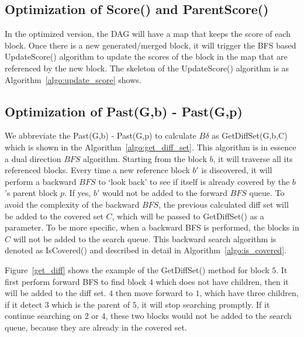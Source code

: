 \subsection{Optimization of Score() and ParentScore() }
In the optimized version, the DAG will have a map that keeps the score of each block. Once there is a new generated/merged block,
it will trigger the BFS based UpdateScore() algorithm to update the scores of the block in the map that are referenced by the new block.
The skeleton of the UpdateScore() algorithm is as Algorithm~\ref{algo:update_score} shows.



\subsection{Optimization of Past(G,b) - Past(G,p)}

We abbreviate the Past(G,b) - Past(G,p) to calculate $B\delta$ as GetDiffSet(G,b,C) which is shown in the Algorithm~\ref{algo:get_diff_set}.
This algorithm is in essence a dual direction $BFS$ algorithm. Starting from the block $b$, it will traverse all its referenced blocks.
Every time a new reference block $b'$ is discovered, it will perform a backward $BFS$ to `look back' to see if itself is already covered by the $b$'s parent block $p$. 
If yes, $b'$ would not be added to the forward $BFS$ queue.  
To avoid the complexity of the backward $BFS$, the previous calculated diff set will be added to the covered set $C$, which will be passed to GetDiffSet() as a parameter.
To be more specific, when a backward BFS is performed, the blocks in $C$ will not be added to the search queue.
This backward search algorithm is denoted as IsCovered() and described in detail in Algorithm~\ref{algo:is_covered}.

Figure~\ref{get_diff} shows the example of the GetDiffSet() method for block $5$.
It first perform forward BFS to find block $4$ which does not have children, then it will be added to the diff set.
$4$ then move forward to $1$, which have three children, if it detect $3$ which is the parent of $5$, it will stop searching promptly.
If it continue searching on $2$ or $4$, these two blocks would not be added to the search queue, because they are already in the covered set.





